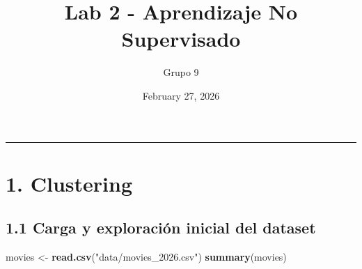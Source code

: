 \documentclass[
]{article}
\title{Lab 2 - Aprendizaje No Supervisado}
\author{Grupo 9}
\date{February 27, 2026}
\newenvironment{Shaded}{\begin{snugshade}}{\end{snugshade}}
\newcommand{\FunctionTok}[1]{\textcolor[rgb]{0.13,0.29,0.53}{\textbf{#1}}}
\newcommand{\NormalTok}[1]{#1}
\newcommand{\OtherTok}[1]{\textcolor[rgb]{0.56,0.35,0.01}{#1}}
\newcommand{\StringTok}[1]{\textcolor[rgb]{0.31,0.60,0.02}{#1}}
\begin{document}
\maketitle

\begin{center}\rule{0.5\linewidth}{0.5pt}\end{center}

\section{1. Clustering}\label{clustering}

\subsection{1.1 Carga y exploración inicial del
dataset}\label{carga-y-exploraciuxf3n-inicial-del-dataset}

\begin{Shaded}
\begin{Highlighting}[]
\NormalTok{movies }\OtherTok{\textless{}{-}} \FunctionTok{read.csv}\NormalTok{(}\StringTok{"data/movies\_2026.csv"}\NormalTok{)}
\FunctionTok{summary}\NormalTok{(movies)}
\end{Highlighting}
\end{Shaded}
\end{document}
